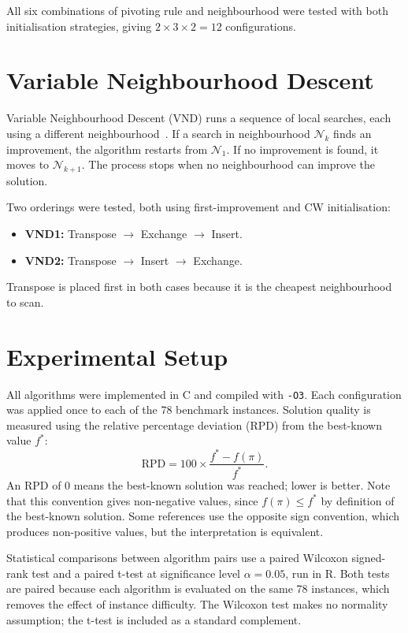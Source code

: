 All six combinations of pivoting rule and neighbourhood were tested with both
initialisation strategies, giving $2 \times 3 \times 2 = 12$ configurations.

\section{Variable Neighbourhood Descent}

Variable Neighbourhood Descent (VND) runs a sequence of local searches, each
using a different neighbourhood~\cite{HanMla01}. If a search in neighbourhood
$\mathcal{N}_k$ finds an improvement, the algorithm restarts from
$\mathcal{N}_1$. If no improvement is found, it moves to $\mathcal{N}_{k+1}$.
The process stops when no neighbourhood can improve the solution.

Two orderings were tested, both using first-improvement and CW initialisation:
\begin{itemize}
    \item \textbf{VND1:} Transpose $\to$ Exchange $\to$ Insert.
    \item \textbf{VND2:} Transpose $\to$ Insert $\to$ Exchange.
\end{itemize}
Transpose is placed first in both cases because it is the cheapest
neighbourhood to scan.

\section{Experimental Setup}

All algorithms were implemented in C and compiled with \texttt{-O3}. Each
configuration was applied once to each of the 78 benchmark instances. Solution
quality is measured using the relative percentage deviation (RPD) from the
best-known value $f^*$:
\begin{equation}
    \text{RPD} = 100 \times \frac{f^* - f(\pi)}{f^*}.
    \label{eq:rpd}
\end{equation}
An RPD of 0 means the best-known solution was reached; lower is better.
Note that this convention gives non-negative values, since $f(\pi) \leq f^*$
by definition of the best-known solution. Some references use the opposite
sign convention, which produces non-positive values, but the interpretation
is equivalent.

Statistical comparisons between algorithm pairs use a paired Wilcoxon
signed-rank test and a paired t-test at significance level $\alpha = 0.05$,
run in R. Both tests are paired because each algorithm is evaluated on the
same 78 instances, which removes the effect of instance difficulty. The
Wilcoxon test makes no normality assumption; the t-test is included as a
standard complement.
